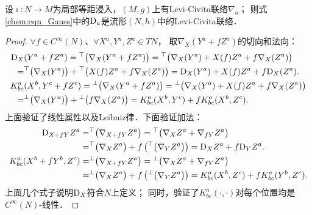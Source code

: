 \begin{theorem}\label{chsm:thm_Dg}
    设$\imath:N\to M$为局部等距浸入，$(M,g)$上有Levi-Civita联络$\nabla_a$；
    则式\eqref{chsm:eqn_Gauss}中的${\rm D}_a$是流形$(N,h)$中的Levi-Civita联络．
\end{theorem}
\begin{proof}
    $\forall f\in C^\infty(N)$、$\forall X^a,Y^a,Z^a\in TN$，
    取${\nabla}_{X} (Y^a+fZ^a)$的切向和法向：
    \begin{align*}
        {\rm D}_{X}& (Y^a+f Z^a)={}^{\top}\bigl({\nabla}_{X} (Y^a+f Z^a)\bigr) 
        ={}^{\top}\bigl({\nabla}_{X} (Y^a)+X(f)Z^a+f {\nabla}_{X} (Z^a)\bigr) \\
        =&{}^{\top}\bigl({\nabla}_{X} (Y^a) \bigr)+{}^{\top}\bigl(X(f)Z^a+f {\nabla}_{X} (Z^a)\bigr)  
        = {\rm D}_{X} (Y^a)+X(f)Z^a +f {\rm D}_{X} (Z^a). \\
        K^a_{bc} &(X^b,Y^c+f Z^c)={}^{\bot}\bigl({\nabla}_{X} (Y^a+fZ^a)\bigr) 
        ={}^{\bot}\bigl({\nabla}_{X} (Y^a)+X(f)Z^a+f{\nabla}_{X} (Z^a)\bigr) \\
        =& {}^{\bot}\bigl({\nabla}_{X} (Y^a)\bigr)
        +{}^{\bot}\bigl(f{\nabla}_{X} (Z^a)\bigr)
        = K^a_{bc} (X^b,Y^c)+f K^a_{bc} (X^b,Z^c).
    \end{align*}
    上面验证了线性属性以及Leibniz律．下面验证加法：
    \begin{align*}
        {\rm D}_{X+fY} Z^a=&{}^{\top}\bigl({\nabla}_{X+fY} Z^a\bigr) 
        ={}^{\top}\bigl({\nabla}_{X} Z^a+{\nabla}_{fY} Z^a\bigr) \\
        =&{}^{\top}\bigl({\nabla}_{X} Z^a\bigr)+f \left({}^{\top}\bigl({\nabla}_{Y} Z^a\bigr)\right)
        ={\rm D}_{X} Z^a + f{\rm D}_{Y} Z^a . \\
        K^a_{bc} (X^b+fY^b, Z^c)=&{}^{\bot}\bigl({\nabla}_{X+fY} Z^a\bigr) 
        ={}^{\bot}\bigl({\nabla}_{X} Z^a+{\nabla}_{fY} Z^a\bigr) \\
        =&{}^{\bot}\bigl({\nabla}_{X} Z^a\bigr)+f\left({}^{\bot}\bigl({\nabla}_{Y} Z^a\bigr)\right)
        =K^a_{bc} (X^b, Z^c)+f K^a_{bc} (Y^b, Z^c) .
    \end{align*}
    上面几个式子说明${\rm D}_X$符合$N$上定义；
    同时，验证了$K^a_{bc} (\cdot, \cdot)$对每个位置均是$C^\infty(N)$-线性．


\end{proof}
